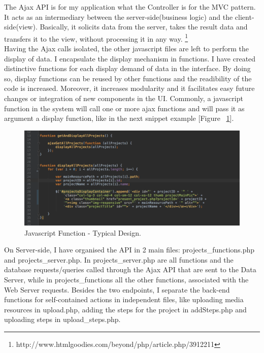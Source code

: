 The Ajax API is for my application what the Controller is for the MVC pattern. It acts as an intermediary between the server-side(business logic) and the client-side(view). Basically, it solicits data from the server, takes the result data and transfers it to the view, without processing it in any way. \footnote{http://www.htmlgoodies.com/beyond/php/article.php/3912211}	\\  

Having the Ajax calls isolated, the other javascript files are left to perform the display of data. I encapsulate the display mechanism in functions. 
I have created distinctive functions for each display demand of data in the interface. By doing so, display functions can be reused by other functions and the readibility of the code is increased. Moreover, it increases modularity and it facilitates easy future changes or integration of new components in the UI.
Commonly, a javascript function in the system will call one or more ajax functions and will pass it as argument a display function, like in the next snippet example [Figure ~\ref{fig:javascript_function}].\\ 

\begin{figure}
\includegraphics[width=1\linewidth]{images/JavascriptFunction.png}
\caption{Javascript Function - Typical Design.}
\label{fig:javascript_function}
\end{figure}

On Server-side, I have organised the API in 2 main files: projects\_functions.php and projects\_server.php. In projects\_server.php are all functions and the database requests/queries called through the Ajax API that are sent to the Data Server, while in projects\_functions all the other functions, associated with the Web Server requests.
Besides the two endpoints, I separate the back-end functions for self-contained actions in independent files, like uploading media resources in upload.php, adding the steps for the project in addSteps.php and uploading steps in upload\_steps.php.\\

